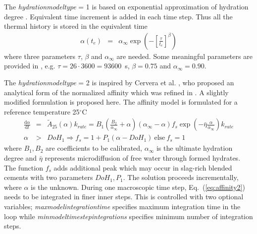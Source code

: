 \documentclass[a4paper]{article}
\newcommand{\param}[1]{{\it #1}}
\newcommand{\ud}{\mathrm{d}}
\newcommand{\refeq}[1]{Eq.~(\ref{#1})}
\newcommand{\C}{$^{\circ}\mathrm{C}$}
\begin{document}
The \param{hydrationmodeltype} = 1 is based on exponential approximation of hydration degree \cite{Schindler:2005}. Equivalent time increment is added in each time step. Thus all the thermal history is stored in the equivalent time
\begin{eqnarray}
\alpha(t_e) &=& \alpha_\infty \exp\left(-\left[\frac{\tau}{t_e} \right]^\beta \right)\label{eq:affinity1}
\end{eqnarray}
where three parameters $\tau$, $\beta$ and $\alpha_\infty$ are needed. Some meaningful parameters are provided in \cite{Schindler:2005}, e.g. $\tau=26\cdot3600=93600$~s, $\beta=0.75$ and $\alpha_\infty=0.90$.

The \param{hydrationmodeltype} = 2 is inspired by Cervera et al. \cite{Cervera:99}, who proposed an analytical form of the normalized affinity which was refined in \cite{Gawin:06a}. A slightly modified formulation is proposed here. The affinity model is formulated for a reference temperature 25\C
\begin{eqnarray}
\frac{\ud \alpha}{\ud t} &=& \tilde{A}_{25}(\alpha) k_{rate}= B_1 \left( \frac{B_2}{\alpha_\infty} + \alpha \right ) \left( \alpha_\infty - \alpha \right) f_s \exp\left(-\bar{\eta}\frac{\alpha}{\alpha_\infty}\right) k_{rate}\label{eq:affinity2}\\
\alpha &>& DoH_1 \Rightarrow f_s = 1+P_1(\alpha - DoH_1)~\mathrm{else}~f_s = 1 \label{eq:affinity3}
\end{eqnarray}
where $B_1, B_2$ are coefficients to be calibrated, $\alpha_\infty$ is the ultimate hydration degree and $\bar{\eta}$ represents microdiffusion of free water through formed hydrates. The function $f_s$ adds additional peak which may occur in slag-rich blended cements with two parameters $DoH_1,P_1$. The solution proceeds incrementally, where $\alpha$ is the unknown. During one macroscopic time step, \refeq{eq:affinity2} needs to be integrated in finer inner steps. This is controlled with two optional variables; \param{maxmodelintegrationtime} specifies maximum integration time in the loop while \param{minmodeltimestepintegrations} specifies minimum number of integration steps.
\end{document}
